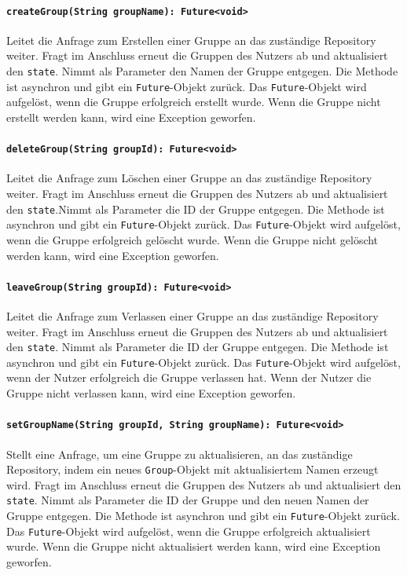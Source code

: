 \documentclass{entwurfsheft}
\begin{document}
\paragraph{\texttt{createGroup(String groupName): Future<void>}}
Leitet die Anfrage zum Erstellen einer Gruppe an das zuständige Repository weiter. Fragt im Anschluss erneut die Gruppen des Nutzers ab und aktualisiert den \texttt{state}. Nimmt als Parameter den Namen der Gruppe entgegen. Die Methode ist asynchron und gibt ein \texttt{Future}-Objekt zurück. Das \texttt{Future}-Objekt wird aufgelöst, wenn die Gruppe erfolgreich erstellt wurde. Wenn die Gruppe nicht erstellt werden kann, wird eine Exception geworfen.
\paragraph{\texttt{deleteGroup(String groupId): Future<void>}}
Leitet die Anfrage zum Löschen einer Gruppe an das zuständige Repository weiter. Fragt im Anschluss erneut die Gruppen des Nutzers ab und aktualisiert den \texttt{state}.Nimmt als Parameter die ID der Gruppe entgegen. Die Methode ist asynchron und gibt ein \texttt{Future}-Objekt zurück. Das \texttt{Future}-Objekt wird aufgelöst, wenn die Gruppe erfolgreich gelöscht wurde. Wenn die Gruppe nicht gelöscht werden kann, wird eine Exception geworfen.
\paragraph{\texttt{leaveGroup(String groupId): Future<void>}}
Leitet die Anfrage zum Verlassen einer Gruppe an das zuständige Repository weiter. Fragt im Anschluss erneut die Gruppen des Nutzers ab und aktualisiert den \texttt{state}. Nimmt als Parameter die ID der Gruppe entgegen. Die Methode ist asynchron und gibt ein \texttt{Future}-Objekt zurück. Das \texttt{Future}-Objekt wird aufgelöst, wenn der Nutzer erfolgreich die Gruppe verlassen hat. Wenn der Nutzer die Gruppe nicht verlassen kann, wird eine Exception geworfen.
\paragraph{\texttt{setGroupName(String groupId, String groupName): Future<void>}}
Stellt eine Anfrage, um eine Gruppe zu aktualisieren, an das zuständige Repository, indem ein neues \texttt{Group}-Objekt mit aktualisiertem Namen erzeugt wird. Fragt im Anschluss erneut die Gruppen des Nutzers ab und aktualisiert den \texttt{state}. Nimmt als Parameter die ID der Gruppe und den neuen Namen der Gruppe entgegen. Die Methode ist asynchron und gibt ein \texttt{Future}-Objekt zurück. Das \texttt{Future}-Objekt wird aufgelöst, wenn die Gruppe erfolgreich aktualisiert wurde. Wenn die Gruppe nicht aktualisiert werden kann, wird eine Exception geworfen.
\end{document}
